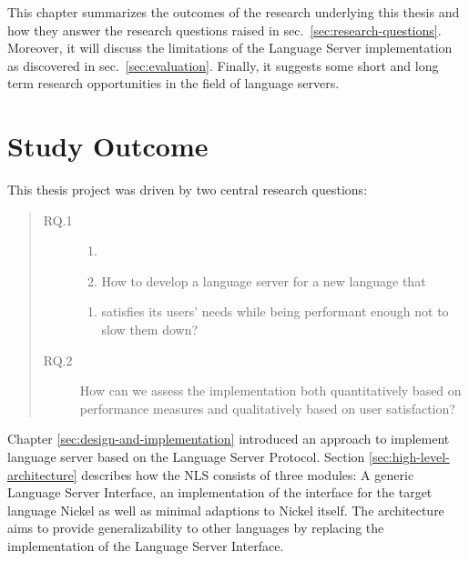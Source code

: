 \documentclass[
  a4paper,
  bibtex,
  english,
  nomenclature]{kthlatex/kththesis/kththesis}
\providecommand{\tightlist}{%
  \setlength{\itemsep}{0pt}\setlength{\parskip}{0pt}}
\begin{document}
This chapter summarizes the outcomes of the research underlying this
thesis and how they answer the research questions raised in
sec.~\ref{sec:research-questions}. Moreover, it will discuss the
limitations of the Language Server implementation as discovered in
sec.~\ref{sec:evaluation}. Finally, it suggests some short and long term
research opportunities in the field of language servers.

\hypertarget{sec:study-outcome}{%
\section{Study Outcome}\label{sec:study-outcome}}

This thesis project was driven by two central research questions:

\begin{quote}
\begin{description}
\item[RQ.1]
\begin{enumerate}
\def\labelenumi{\alph{enumi})}
\tightlist
\item[]
\item
  How to develop a language server for a new language that
\end{enumerate}

\begin{enumerate}
\def\labelenumi{\alph{enumi})}
\setcounter{enumi}{1}
\tightlist
\item
  satisfies its users' needs while being performant enough not to slow
  them down?
\end{enumerate}
\item[RQ.2]
How can we assess the implementation both quantitatively based on
performance measures and qualitatively based on user satisfaction?
\end{description}
\end{quote}

Chapter \ref{sec:design-and-implementation} introduced an approach to
implement language server based on the Language Server Protocol. Section
\ref{sec:high-level-architecture} describes how the NLS consists of
three modules: A generic Language Server Interface, an implementation of
the interface for the target language Nickel as well as minimal
adaptions to Nickel itself. The architecture aims to provide
generalizability to other languages by replacing the implementation of
the Language Server Interface.
\end{document}
